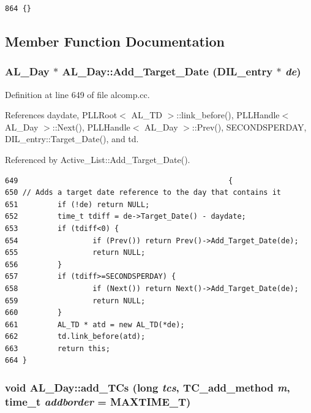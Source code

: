 \footnotesize\begin{verbatim}864 {} 
\end{verbatim}\normalsize 


\subsection{Member Function Documentation}
\subsubsection{\setlength{\rightskip}{0pt plus 5cm}AL\_\-Day $\ast$ AL\_\-Day::Add\_\-Target\_\-Date ({\bf DIL\_\-entry} $\ast$ {\em de})}\label{classAL__Day_a24}




Definition at line 649 of file alcomp.cc.

References daydate, PLLRoot$<$ AL\_\-TD $>$::link\_\-before(), PLLHandle$<$ AL\_\-Day $>$::Next(), PLLHandle$<$ AL\_\-Day $>$::Prev(), SECONDSPERDAY, DIL\_\-entry::Target\_\-Date(), and td.

Referenced by Active\_\-List::Add\_\-Target\_\-Date().



\footnotesize\begin{verbatim}649                                                {
650 // Adds a target date reference to the day that contains it
651         if (!de) return NULL;
652         time_t tdiff = de->Target_Date() - daydate;
653         if (tdiff<0) {
654                 if (Prev()) return Prev()->Add_Target_Date(de);
655                 return NULL;
656         }
657         if (tdiff>=SECONDSPERDAY) {
658                 if (Next()) return Next()->Add_Target_Date(de);
659                 return NULL;
660         }
661         AL_TD * atd = new AL_TD(*de);
662         td.link_before(atd);
663         return this;
664 }
\end{verbatim}\normalsize 
{}
\subsubsection{\setlength{\rightskip}{0pt plus 5cm}void AL\_\-Day::add\_\-TCs (long {\em tcs}, {\bf TC\_\-add\_\-method} {\em m}, time\_\-t {\em addborder} = MAXTIME\_\-T)}\label{classAL__Day_a18}




